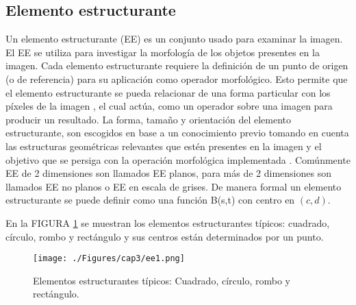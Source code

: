 \subsection{Elemento estructurante}
Un elemento estructurante (EE) es un conjunto usado para examinar la imagen. %
El EE se utiliza para investigar la morfología de los objetos presentes en la imagen. 
Cada elemento estructurante requiere la definición de un punto  de origen (o de referencia) para su aplicación como operador morfológico. Esto permite que el elemento estructurante se pueda relacionar de una forma particular con los píxeles de la imagen \cite{sonka2008image},
el cual actúa, como un operador sobre una imagen para  producir un resultado. La forma,  tamaño  y  orientación  del  elemento  estructurante,  son escogidos  en  base  a  un  conocimiento  previo tomando en  cuenta  las  estructuras  geométricas relevantes  que  estén  presentes  en  la  imagen  y  el  objetivo  que  se  persiga con la operación morfológica implementada \cite{qiu2005image,shih2010image,sonka2008image,cui2008edge}.
Comúnmente EE de 2 dimensiones son llamados EE planos, para más de 2 dimensiones son llamados EE no planos o EE en escala de grises. De manera formal un elemento estructurante se puede definir como una función B(s,t) con centro en $(c,d)$.

  
    En la FIGURA \ref{fig:ee} se muestran los elementos estructurantes típicos: cuadrado, círculo, rombo y rectángulo y sus centros están determinados por un punto.  

\begin{figure}[H]
	\centering
		\texttt{[image: ./Figures/cap3/ee1.png]}
	\caption{Elementos estructurantes típicos: Cuadrado, círculo, rombo y rectángulo.}
	\label{fig:ee}
\end{figure}
   


